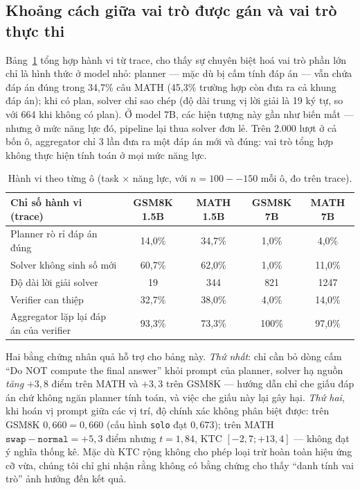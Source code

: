 \subsection{Khoảng cách giữa vai trò được gán và vai trò thực thi}\label{sec:roles}

Bảng~\ref{tab:behavior} tổng hợp hành vi từ trace, cho thấy sự chuyên biệt hoá vai trò phần lớn chỉ là hình thức ở model nhỏ: planner --- mặc dù bị cấm tính đáp án --- vẫn chứa đáp án đúng trong 34,7\% câu MATH (45,3\% trường hợp còn đưa ra cả khung đáp án); khi có plan, solver chỉ sao chép (độ dài trung vị lời giải là 19 ký tự, so với 664 khi không có plan). Ở model 7B, các hiện tượng này gần như biến mất --- nhưng ở mức năng lực đó, pipeline lại thua solver đơn lẻ. Trên 2.000 lượt ở cả bốn ô, aggregator chỉ 3 lần đưa ra một đáp án mới và đúng: vai trò tổng hợp không thực hiện tính toán ở mọi mức năng lực.

\begin{table}[h]\centering\small
\begin{tabular}{@{}l c c c c@{}}
\toprule
Chỉ số hành vi (trace) & GSM8K 1.5B & MATH 1.5B & GSM8K 7B & MATH 7B\\
\midrule
Planner rò rỉ đáp án đúng & 14,0\% & 34,7\% & 1,0\% & 4,0\%\\
Solver không sinh số mới & 60,7\% & 62,0\% & 1,0\% & 11,0\%\\
Độ dài lời giải solver & 19 & 344 & 821 & 1247\\
Verifier can thiệp & 32,7\% & 38,0\% & 4,0\% & 14,0\%\\
Aggregator lặp lại đáp án của verifier & 93,3\% & 73,3\% & 100\% & 97,0\%\\
\bottomrule
\end{tabular}
\caption{Hành vi theo từng ô (task $\times$ năng lực, với $n=100--150$ mỗi ô, đo trên trace).}
\label{tab:behavior}
\end{table}

Hai bằng chứng nhân quả hỗ trợ cho bảng này. \emph{Thứ nhất}: chỉ cần bỏ dòng cấm ``Do NOT compute the final answer'' khỏi prompt của planner, solver hạ nguồn \emph{tăng} $+3{,}8$ điểm trên MATH và $+3{,}3$ trên GSM8K --- hướng dẫn chỉ che giấu đáp án chứ không ngăn planner tính toán, và việc che giấu này lại gây hại. \emph{Thứ hai}, khi hoán vị prompt giữa các vị trí, độ chính xác không phân biệt được: trên GSM8K $0{,}660 = 0{,}660$ (cấu hình \texttt{solo} đạt $0{,}673$); trên MATH $\texttt{swap}-\texttt{normal} = +5{,}3$ điểm nhưng $t=1{,}84$, KTC $[-2{,}7;+13{,}4]$ --- không đạt ý nghĩa thống kê. Mặc dù KTC rộng không cho phép loại trừ hoàn toàn hiệu ứng cỡ vừa, chúng tôi chỉ ghi nhận rằng không có bằng chứng cho thấy ``danh tính vai trò'' ảnh hưởng đến kết quả.

